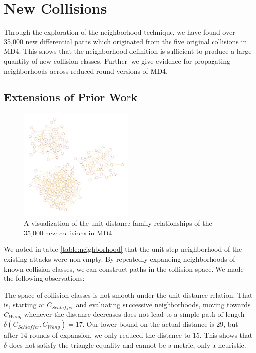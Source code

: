 \documentclass[conference]{IEEEtran}
\begin{document}
\section{New Collisions} \label{Sec:Collision}

Through the exploration of the neighborhood technique, we have found over
35,000 new differential paths which originated from the five original
collisions in MD4. This shows that the neighborhood definition is sufficient
to produce a large quantity of new collision classes. Further, we give
evidence for propagating neighborhoods across reduced round versions of MD4.

\subsection{Extensions of Prior Work}

\begin{figure}
\begin{center}
\includegraphics[width=0.5\textwidth]{Figs/families48.pdf}
\caption{A visualization of the unit-distance family relationships
of the 35,000 new collisions in MD4. }
\label{Fig:Families48}
\end{center}
\end{figure}

We noted in table \ref{table:neighborhood} that the unit-step neighborhood of
the existing attacks were non-empty. By repeatedly expanding neighborhoods of
known collision classes, we can construct paths in the collision space. We
made the following observations:

The space of collision classes is not smooth under the unit distance
relation. That is, starting at $C_{Schlaffer}$ and evaluating
successive neighborhoods, moving towards $C_{Wang}$ whenever the
distance decreases does not lead to a simple path of length
$\delta(C_{Schlaffer}, C_{Wang}) = 17$. Our lower bound on the actual
distance is 29, but after 14 rounds of expansion, we only reduced the
distance to 15. This shows that $\delta$ does not satisfy the triangle
equality and cannot be a metric, only a heuristic.
\end{document}
